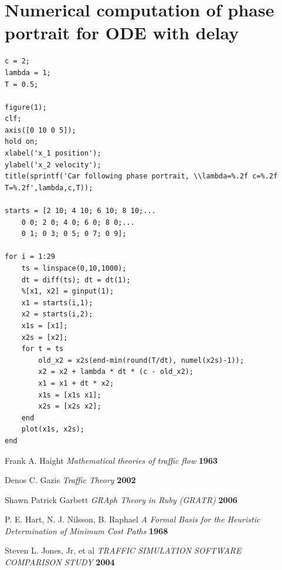 \documentclass[11pt,a4paper]{article}
\begin{document}
\section{Numerical computation of phase portrait for ODE with delay}
\begin{verbatim}
c = 2;
lambda = 1;
T = 0.5;

figure(1);
clf;
axis([0 10 0 5]);
hold on;
xlabel('x_1 position');
ylabel('x_2 velocity');
title(sprintf('Car following phase portrait, \\lambda=%.2f c=%.2f T=%.2f',lambda,c,T));

starts = [2 10; 4 10; 6 10; 8 10;...
    0 0; 2 0; 4 0; 6 0; 8 0;...
    0 1; 0 3; 0 5; 0 7; 0 9];

for i = 1:29
    ts = linspace(0,10,1000);
    dt = diff(ts); dt = dt(1);
    %[x1, x2] = ginput(1);
    x1 = starts(i,1);
    x2 = starts(i,2);
    x1s = [x1];
    x2s = [x2];
    for t = ts
        old_x2 = x2s(end-min(round(T/dt), numel(x2s)-1));
        x2 = x2 + lambda * dt * (c - old_x2);
        x1 = x1 + dt * x2;
        x1s = [x1s x1];
        x2s = [x2s x2];
    end
    plot(x1s, x2s);
end
\end{verbatim}

\begin{thebibliography}{99}
 Frank A. Haight
{\it Mathematical theories of traffic flow} {\bf 1963}

 Denos C. Gazis
{\it Traffic Theory} {\bf 2002}

 Shawn Patrick Garbett
{\it GRAph Theory in Ruby (GRATR)} {\bf 2006}

 P. E. Hart, N. J. Nilsson, B. Raphael
{\it A Formal Basis for the Heuristic Determination of Minimum Cost Paths} {\bf 1968}

 Steven L. Jones, Jr, et al
{\it TRAFFIC SIMULATION SOFTWARE COMPARISON STUDY} {\bf 2004}

\end{thebibliography}
\end{document}
